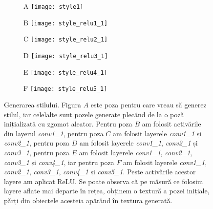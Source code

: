 \begin{figure}[h]
	\centering
    \begin{subfigure}[b]{0.4\textwidth}
    	A
		\centering
        \texttt{[image: style1]}
        \label{fig:content}
	\end{subfigure}
    \hfill
    \begin{subfigure}[b]{0.4\textwidth}
    	B
		\centering
        \texttt{[image: style\_relu1\_1]}
        \label{fig:style_relu1_1}
	\end{subfigure}
    \begin{subfigure}[b]{0.4\textwidth}
    	C
		\centering
        \texttt{[image: style\_relu2\_1]}
        \label{fig:style_relu2_1}
	\end{subfigure}
    \hfill
    \begin{subfigure}[b]{0.4\textwidth}
    	D
		\centering
        \texttt{[image: style\_relu3\_1]}
        \label{fig:style_relu3_1}
	\end{subfigure}
    \begin{subfigure}[b]{0.4\textwidth}
    	E
		\centering
        \texttt{[image: style\_relu4\_1]}
        \label{fig:style_relu4_1}
	\end{subfigure}
    \hfill
    \begin{subfigure}[b]{0.4\textwidth}
    	F
		\centering
        \texttt{[image: style\_relu5\_1]}
        \label{fig:content_relu5_1}
	\end{subfigure}
    \caption{Generarea stilului. Figura $A$ este poza pentru care vreau să generez stilul, iar celelalte sunt pozele generate plecând de la o poză inițializată cu zgomot aleator. Pentru poza $B$ am folosit activările din layerul \textit{conv1{\_}1}, pentru poza $C$ am folosit layerele \textit{conv1{\_}1} și \textit{conv2{\_}1}, pentru poza $D$ am folosit layerele \textit{conv1{\_}1}, \textit{conv2{\_}1} și \textit{conv3{\_}1}, pentru poza $E$ am folosit layerele \textit{conv1{\_}1}, \textit{conv2{\_}1}, \textit{conv3{\_}1} și \textit{conv4{\_}1}, iar pentru poza $F$ am folosit layerele \textit{conv1{\_}1}, \textit{conv2{\_}1}, \textit{conv3{\_}1}, \textit{conv4{\_}1} și \textit{conv5{\_}1}. Peste activările acestor layere am aplicat ReLU. Se poate observa că pe măsură ce folosim layere aflate mai departe în rețea, obținem o textură a pozei inițiale, părți din obiectele acesteia apărând în textura generată.}
    \label{fig:style_rec}
\end{figure}

